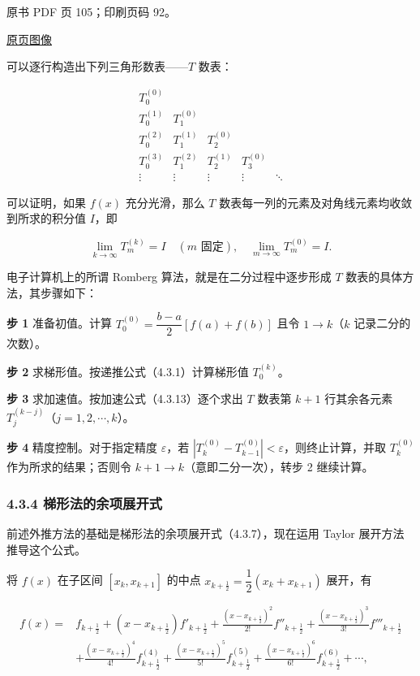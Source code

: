原书 PDF 页 105；印刷页码 92。

\href{source-images/pdf-105.jpeg}{原页图像}

可以逐行构造出下列三角形数表------\(T\) 数表：

\[
\begin{array}{ccccc}
T_0^{(0)}&&&&\\
T_0^{(1)}&T_1^{(0)}&&&\\
T_0^{(2)}&T_1^{(1)}&T_2^{(0)}&&\\
T_0^{(3)}&T_1^{(2)}&T_2^{(1)}&T_3^{(0)}&\\
\vdots&\vdots&\vdots&\vdots&\ddots
\end{array}
\]

可以证明，如果 \(f(x)\) 充分光滑，那么 \(T\) 数表每一列的元素及对角线元素均收敛到所求的积分值 \(I\)，即

\[
\lim_{k\to\infty}T_m^{(k)}=I\quad(m\text{ 固定}),\quad\lim_{m\to\infty}T_m^{(0)}=I.
\]

电子计算机上的所谓 Romberg 算法，就是在二分过程中逐步形成 \(T\) 数表的具体方法，其步骤如下：

\textbf{步 1} 准备初值。计算 \(T_0^{(0)}=\dfrac{b-a}{2}[f(a)+f(b)]\) 且令 \(1\to k\)（\(k\) 记录二分的次数）。

\textbf{步 2} 求梯形值。按递推公式（4.3.1）计算梯形值 \(T_0^{(k)}\)。

\textbf{步 3} 求加速值。按加速公式（4.3.13）逐个求出 \(T\) 数表第 \(k+1\) 行其余各元素 \(T_j^{(k-j)}\)（\(j=1,2,\cdots,k\)）。

\textbf{步 4} 精度控制。对于指定精度 \(\varepsilon\)，若 \(|T_k^{(0)}-T_{k-1}^{(0)}|<\varepsilon\)，则终止计算，并取 \(T_k^{(0)}\) 作为所求的结果；否则令 \(k+1\to k\)（意即二分一次），转步 2 继续计算。

\subsubsection{4.3.4 梯形法的余项展开式}\label{ch04a-ux68afux5f62ux6cd5ux7684ux4f59ux9879ux5c55ux5f00ux5f0f}

前述外推方法的基础是梯形法的余项展开式（4.3.7），现在运用 Taylor 展开方法推导这个公式。

将 \(f(x)\) 在子区间 \([x_k,x_{k+1}]\) 的中点 \(x_{k+\frac12}=\dfrac12(x_k+x_{k+1})\) 展开，有

\[
\begin{aligned}
f(x)={}&f_{k+\frac12}+(x-x_{k+\frac12})f'_{k+\frac12}
+\frac{(x-x_{k+\frac12})^2}{2!}f''_{k+\frac12}
+\frac{(x-x_{k+\frac12})^3}{3!}f'''_{k+\frac12}\\
&+\frac{(x-x_{k+\frac12})^4}{4!}f^{(4)}_{k+\frac12}
+\frac{(x-x_{k+\frac12})^5}{5!}f^{(5)}_{k+\frac12}
+\frac{(x-x_{k+\frac12})^6}{6!}f^{(6)}_{k+\frac12}+\cdots,
\end{aligned}
\tag{4.3.14}
\]

